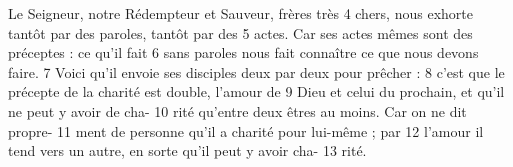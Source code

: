 Le Seigneur, notre Rédempteur et Sauveur, frères très	 
4	 	chers, nous exhorte tantôt par des paroles, tantôt par des	 
5	 	actes. Car ses actes mêmes sont des préceptes : ce qu'il fait	 
6	 	sans paroles nous fait connaître ce que nous devons faire.	 
7	 	Voici qu'il envoie ses disciples deux par deux pour prêcher :	 
8	 	c'est que le précepte de la charité est double, l'amour de	 
9	 	Dieu et celui du prochain, et qu'il ne peut y avoir de cha-	 
10	 	rité qu'entre deux êtres au moins. Car on ne dit propre-	 
11	 	ment de personne qu'il a charité pour lui-même ; par	 
12	 	l'amour il tend vers un autre, en sorte qu'il peut y avoir cha-	 
13	 	rité.
